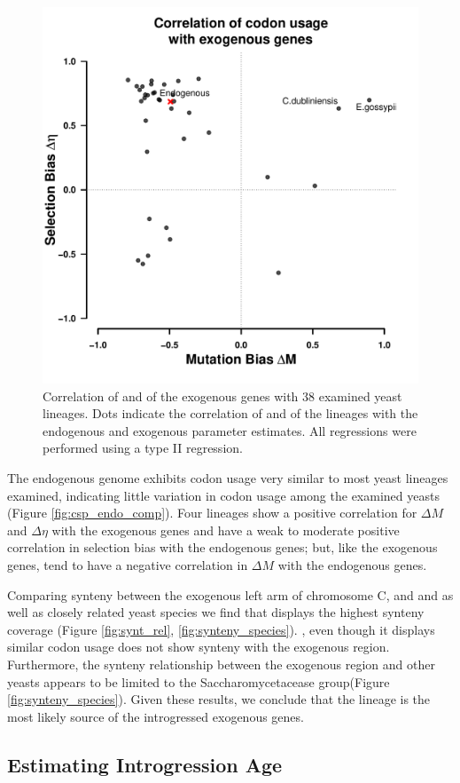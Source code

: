 \documentclass[12pt]{article}
\begin{document}
\begin{figure}[H]
     \centering
	\includegraphics[width=.45\textwidth]{img/csp_mean_correlation_exo.pdf}
	\caption{Correlation of \DM and \DE of the exogenous genes with 38 examined yeast lineages. Dots indicate the correlation of \DM and \DE of the lineages with the endogenous and exogenous parameter estimates. All regressions were performed using a type II regression.}
	\label{fig:csp_exo_comp}
\end{figure}

The endogenous \kluyveri genome exhibits codon usage very similar to most yeast lineages examined, indicating little variation in codon usage among the examined yeasts (Figure \ref{fig:csp_endo_comp}).
Four lineages show a positive correlation for $\Delta M$ and $\Delta \eta$ with the exogenous genes and have a weak to moderate positive correlation in selection bias with the endogenous genes; but, like the exogenous genes, tend to have a negative correlation in $\Delta M$ with the endogenous genes.

Comparing synteny between the exogenous left arm of chromosome C, and \gossypii and \dubl as well as closely related yeast species we find that \gossypii displays the highest synteny coverage  (Figure \ref{fig:synt_rel}, \ref{fig:synteny_species}).
\dubl, even though it displays similar codon usage does not show synteny with the exogenous region.
Furthermore, the synteny relationship between the exogenous region and other yeasts appears to be limited to the Saccharomycetacease group(Figure \ref{fig:synteny_species}).
Given these results, we conclude that the \gossypii lineage is the most likely source of the introgressed exogenous genes.

\subsection*{Estimating Introgression Age}
\end{document}
